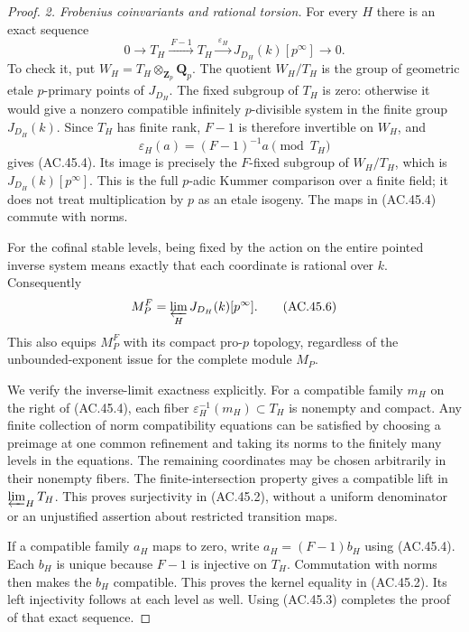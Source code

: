 \begin{proof}
\emph{2. Frobenius coinvariants and rational torsion.}
For every $H$ there is an exact sequence
\[
 0\longrightarrow T_H\xrightarrow{\ F-1\ }T_H
     \xrightarrow{\ \varepsilon_H\ }
       J_{D_H}(k)[p^\infty]\longrightarrow0.
                                                        \tag{AC.45.4}
\]
To check it, put $W_H=T_H\otimes_{\mathbf Z_p}\mathbf Q_p$.
The quotient $W_H/T_H$ is the group of geometric
etale $p$-primary points of $J_{D_H}$. The fixed
subgroup of $T_H$ is zero: otherwise it would give
a nonzero compatible infinitely $p$-divisible
system in the finite group $J_{D_H}(k)$.
Since $T_H$ has finite rank, $F-1$ is therefore
invertible on $W_H$, and
\[
 \varepsilon_H(a)=(F-1)^{-1}a\pmod {T_H}
                                                        \tag{AC.45.5}
\]
gives (AC.45.4). Its image is precisely the
$F$-fixed subgroup of $W_H/T_H$, which is
$J_{D_H}(k)[p^\infty]$. This is the full $p$-adic
Kummer comparison over a finite field; it does not
treat multiplication by $p$ as an etale isogeny.
The maps in (AC.45.4) commute with norms.

For the cofinal stable levels, being fixed by the
action on the entire pointed inverse system means
exactly that each coordinate is rational over $k$.
Consequently
\[
           M_P^F=\varprojlim_H J_{D_H}(k)[p^\infty].
                                                        \tag{AC.45.6}
\]
This also equips $M_P^F$ with its compact pro-$p$
topology, regardless of the unbounded-exponent issue
for the complete module $M_P$.

We verify the inverse-limit exactness explicitly.
For a compatible family $m_H$ on the right of
(AC.45.4), each fiber
$\varepsilon_H^{-1}(m_H)\subset T_H$ is nonempty
and compact. Any finite collection of norm
compatibility equations can be satisfied by choosing
a preimage at one common refinement and taking its
norms to the finitely many levels in the equations.
The remaining coordinates may be chosen arbitrarily
in their nonempty fibers. The finite-intersection
property gives a compatible lift in
$\varprojlim_H T_H$. This proves surjectivity in
(AC.45.2), without a uniform denominator or an
unjustified assertion about restricted transition maps.

If a compatible family $a_H$ maps to zero, write
$a_H=(F-1)b_H$ using (AC.45.4). Each $b_H$ is
unique because $F-1$ is injective on $T_H$.
Commutation with norms then makes the $b_H$
compatible. This proves the kernel equality in
(AC.45.2). Its left injectivity follows at each
level as well. Using (AC.45.3) completes the proof
of that exact sequence.


\end{proof}
